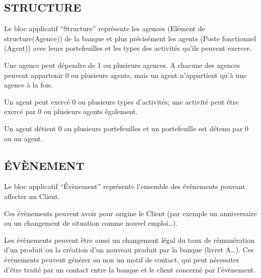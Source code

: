        \subsection{STRUCTURE}

Le bloc applicatif “Structure” représente les agences (Elément de structure(Agence)) de la banque et plus précisément les agents (Poste fonctionnel (Agent)) avec leurs portefeuilles et les types des activités qu’ils peuvent exercer.

Une agence peut dépendre de 1 ou plusieurs agences. A chacune des agences peuvent appartenir 0 ou plusieurs agents, mais un agent n’appartient qu’à une agence à la fois.

Un agent peut exercé 0 ou plusieurs types d’activités; une activité peut être exercé par 0 ou plusieurs agents également.

Un agent détient 0 ou plusieurs portefeuilles et un portefeuille est détenu par 0 ou un agent.

       \subsection{ÉVÈNEMENT}

Le bloc applicatif “Évènement” représente l’ensemble des évènements pouvant affecter un Client.

Ces évènements peuvent avoir pour origine le Client (par exemple un anniversaire ou un changement de situation comme nouvel emploi…).

Les évènements peuvent être aussi un changement légal du taux de rémunération d’un produit ou la création d’un nouveau produit par la banque (livret A…). Ces évènements peuvent générer ou non un motif de contact, qui peut nécessiter d’être traité par  un contact entre la banque et le client concerné par l’évènement.

